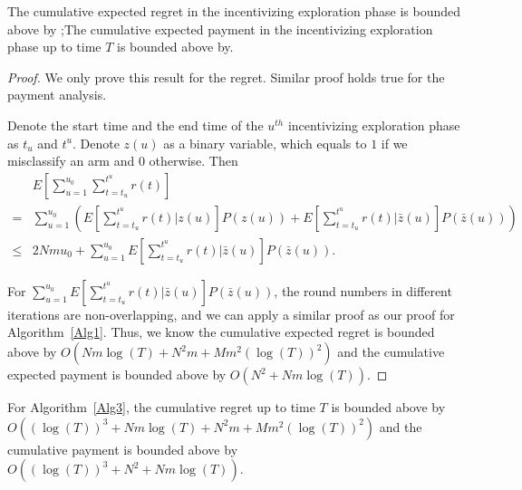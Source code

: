 \begin{lemma}
The cumulative expected regret in the incentivizing exploration phase is bounded above by ;The cumulative expected payment in the incentivizing exploration phase up to time $T$ is bounded above by.
\end{lemma}
\begin{proof}
We only prove this result for the regret. Similar proof holds true for the payment analysis. 

Denote the start time and the end time of the $u^{th}$ incentivizing exploration phase as $t_u$ and $t^u$. Denote $z(u)$ as a binary variable, which equals to $1$ if we misclassify an arm and $0$ otherwise. Then
\begin{align}
&E\left[\sum_{u=1}^{u_0}\sum_{t=t_u}^{t^{u}}r(t)\right] \nonumber \\
=&\sum_{u=1}^{u_0} \left(E\left[\sum_{t=t_u}^{t^{u}}r(t)|z(u)\right]P(z(u)) + E\left[\sum_{t=t_u}^{t^{u}}r(t)|\bar{z}(u)\right]P(\bar{z}(u))\right) \nonumber \\
\leq & 2Nm u_0 + \sum_{u=1}^{u_0}E\left[\sum_{t=t_u}^{t^{u}}r(t)|\bar{z}(u)\right]P(\bar{z}(u)). \nonumber 
\end{align}

For $\sum_{u=1}^{u_0}E\left[\sum_{t=t_u}^{t^{u}}r(t)|\bar{z}(u)\right]P(\bar{z}(u))$, the round numbers in different iterations are non-overlapping, and we can apply a similar proof as our proof for Algorithm~\ref{Alg1}. Thus, we know the cumulative expected regret is bounded above by $O(Nm\log(T) + N^2m + Mm^2(\log(T))^2)$ and the cumulative expected payment is bounded above by $O(N^2 + Nm \log(T))$.


\end{proof}

\begin{theorem}
For Algorithm~\ref{Alg3}, the cumulative regret up to time $T$ is bounded above by $O((\log(T))^3 + Nm\log(T) + N^2m + Mm^2(\log(T))^2)$ and the cumulative payment is bounded above by $O((\log(T))^3 + N^2 + Nm \log(T))$.
\end{theorem}




